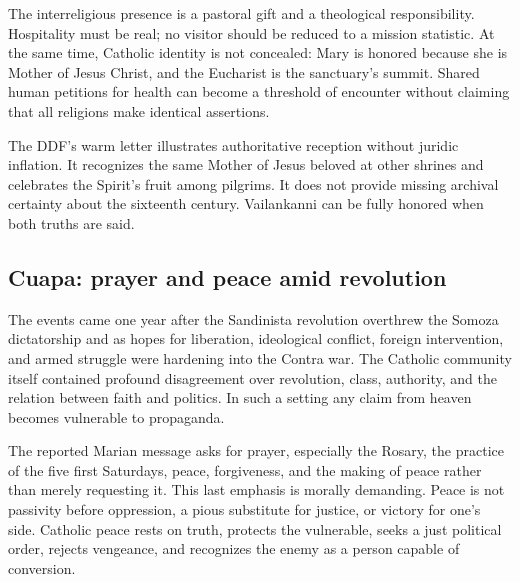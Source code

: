 The interreligious presence is a pastoral gift and a theological responsibility. Hospitality must be real; no visitor should be reduced to a mission statistic. At the same time, Catholic identity is not concealed: Mary is honored because she is Mother of Jesus Christ, and the Eucharist is the sanctuary's summit. Shared human petitions for health can become a threshold of encounter without claiming that all religions make identical assertions.

The DDF's warm letter illustrates authoritative reception without juridic inflation. It recognizes the same Mother of Jesus beloved at other shrines and celebrates the Spirit's fruit among pilgrims. It does not provide missing archival certainty about the sixteenth century. Vailankanni can be fully honored when both truths are said.

\subsection{Cuapa: prayer and peace amid revolution}


The events came one year after the Sandinista revolution overthrew the Somoza dictatorship and as hopes for liberation, ideological conflict, foreign intervention, and armed struggle were hardening into the Contra war. The Catholic community itself contained profound disagreement over revolution, class, authority, and the relation between faith and politics. In such a setting any claim from heaven becomes vulnerable to propaganda.

The reported Marian message asks for prayer, especially the Rosary, the practice of the five first Saturdays, peace, forgiveness, and the making of peace rather than merely requesting it. This last emphasis is morally demanding. Peace is not passivity before oppression, a pious substitute for justice, or victory for one's side. Catholic peace rests on truth, protects the vulnerable, seeks a just political order, rejects vengeance, and recognizes the enemy as a person capable of conversion.

